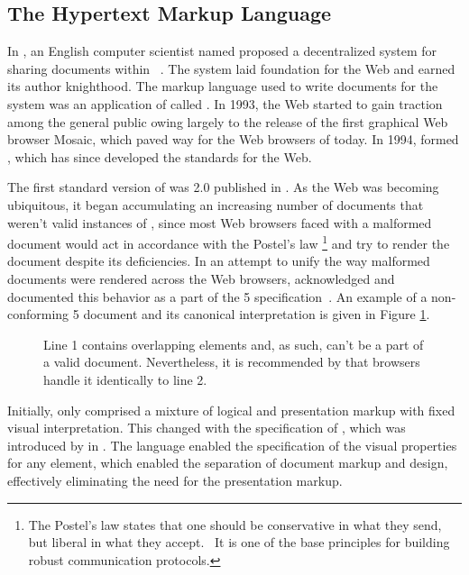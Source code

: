 \subsection{The Hypertext Markup Language}
In \citeyear{bernerslee89}, an English computer scientist named  proposed a decentralized system for sharing documents within
~\cite{bernerslee89}. The system laid foundation for the Web and
earned its author knighthood. The markup language used to write documents for
the system was an application of  called . In 1993,
the Web started to gain traction among the general public owing largely to the
release of the first graphical Web browser Mosaic, which paved way for the Web
browsers of today. In 1994,  formed
, which has since developed the standards for the Web.

The first standard version of  was  2.0
\cite{bernerslee95} published in \citeyear{bernerslee95}. As the Web was
becoming ubiquitous, it began accumulating an increasing number of documents
that weren't valid instances of , since most Web browsers faced
with a malformed document would act in accordance with the Postel's law%
\footnote{
  The Postel's law states that one should be conservative in what they send, but
  liberal in what they accept.~\cite[sec.\,2.10]{postel80} It is one of the base
  principles for building robust communication protocols.}
and try to render the document despite its deficiencies. In an attempt to unify
the way malformed  documents were rendered across the Web
browsers,  acknowledged and documented this behavior as a part of
the 5 specification~\cite[sec.\,8.2]{hickson14}. An example of
a non-conforming 5 document and its canonical interpretation is
given in Figure \ref{fig:overlapping-elements}.

\begin{figure}[b]
  \caption{Line 1 contains overlapping elements and, as such, can't be a part of
    a valid  document. Nevertheless, it is recommended by
     that browsers handle it identically to line 2.}
  \label{fig:overlapping-elements}
\end{figure}

Initially,  only comprised a mixture of logical and presentation
markup with fixed visual interpretation. This changed with the specification of
, which was introduced by  in \citeyear{lie96}. The
language enabled the specification of the visual properties for any
 element, which enabled the separation of document markup and
design, effectively eliminating the need for the presentation markup.

